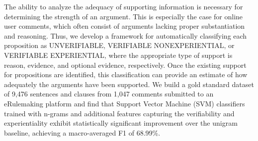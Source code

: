 The ability to analyze the adequacy of supporting information is necessary for determining the strength of an argument. This is especially the case for online user comments, which often consist of arguments lacking proper substantiation and reasoning. Thus, we develop a framework for automatically classifying each proposition as UNVERIFIABLE, VERIFIABLE NONEXPERIENTIAL, or VERIFIABLE EXPERIENTIAL, where the appropriate type of support is reason, evidence, and optional evidence, respectively. Once the existing support for propositions are identified, this classification can provide an estimate of how adequately the arguments have been supported. We build a gold standard dataset of 9,476 sentences and clauses from 1,047 comments submitted to an eRulemaking platform and find that Support Vector Machine (SVM) classifiers trained with n-grams and additional features capturing the verifiability and experientiality exhibit statistically significant improvement over the unigram baseline, achieving a macro-averaged F1 of 68.99\%.
